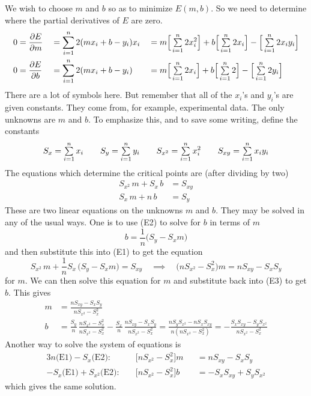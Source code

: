 \begin{eg}
\soln 
 We wish to choose $m$ and $b$ so as to minimize $E(m,b)$. So we need
to determine where the partial derivatives of $E$ are zero.
\begin{alignat*}{3}
0&=\frac{\partial E}{\partial m}&&=\sum_{i=1}^n 2(mx_i+b-y_i)x_i
&&=m\Big[\mathop{{\textstyle \sum}}_{i=1}^n 2x^2_i\Big]+b\Big[\mathop{{\textstyle \sum}}_{i=1}^n 2x_i\Big]
-\Big[\mathop{{\textstyle \sum}}_{i=1}^n 2x_iy_i\Big]\\
0&=\frac{\partial E}{\partial b}&&=\sum_{i=1}^n 2(mx_i+b-y_i)
&&=m\Big[\mathop{{\textstyle \sum}}_{i=1}^n 2x_i\Big]+b\Big[\mathop{{\textstyle \sum}}_{i=1}^n 2\Big]
-\Big[\mathop{{\textstyle \sum}}_{i=1}^n 2y_i\Big]
\end{alignat*}
There are a lot of symbols here. But remember that all of the $x_i$'s and
$y_i$'s are given constants. They come from, for example, experimental data.
The only unknowns are $m$ and $b$. To emphasize this, and to save some 
writing, define the constants
\begin{equation*}
S_x=\mathop{{\textstyle \sum}}_{i=1}^n x_i\qquad
S_y=\mathop{{\textstyle \sum}}_{i=1}^n y_i\qquad
S_{x^2}=\mathop{{\textstyle \sum}}_{i=1}^n x^2_i\qquad
S_{xy}=\mathop{{\textstyle \sum}}_{i=1}^n x_iy_i
\end{equation*}
The equations which determine the critical points are (after dividing by two)
\begin{subequations}
\begin{align*}
S_{x^2}\, m+S_x\, b&=S_{xy} \tag{E1}\\
S_{x}\, m+n\, b&=S_{y}      \tag{E2}
\end{align*}
\end{subequations}
These are two linear equations on the unknowns $m$ and $b$. They may be
solved in any of the usual ways. One is to use (E2) to
solve for $b$ in terms of $m$
\begin{equation*}
b=\frac{1}{n}\big(S_y-S_xm\big)\tag{E3}
\end{equation*}
and then substitute this into (E1) to get the equation
\begin{equation*}
S_{x^2}\, m+\frac{1}{n}S_x\, \big(S_y-S_xm\big)=S_{xy}\quad\implies\quad
\big(nS_{x^2} -S_x^2\big) m = nS_{xy}-S_xS_y
\end{equation*}
for $m$. We can then solve this equation for $m$ and substitute back into
(E3) to get $b$. This gives
\begin{align*}
m&=\frac{nS_{xy}-S_xS_y}{nS_{x^2} -S_x^2} \\
b&=\frac{S_y}{n}\,\frac{nS_{x^2} -S_x^2}{nS_{x^2} -S_x^2}
   -\frac{S_x}{n}\,\frac{nS_{xy}-S_xS_y}{nS_{x^2} -S_x^2}
=\frac{nS_yS_{x^2}-nS_xS_{xy}}{n(nS_{x^2} -S_x^2)}
=-\frac{S_xS_{xy}-S_yS_{x^2}}{nS_{x^2} -S_x^2}
\end{align*}
Another way to solve the system of equations is
\begin{alignat*}{3}
n\text{(E1)}-S_x\text{(E2)}:&\quad \Big[nS_{x^2} -S_x^2\Big]m&&=nS_{xy}-S_xS_y\\
-S_x\text{(E1)}+S_{x^2}\text{(E2)}:&\quad 
          \Big[nS_{x^2} -S_x^2\Big]b&&=-S_xS_{xy}+S_yS_{x^2}
\end{alignat*}
which gives the same solution.


\end{eg}
